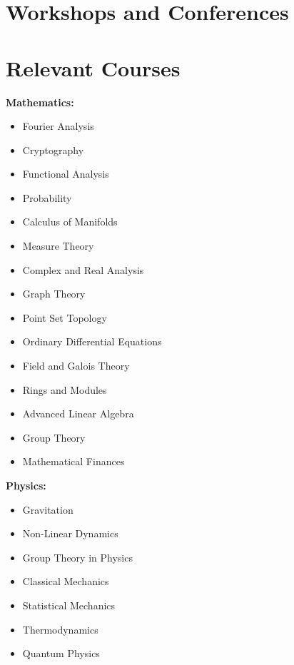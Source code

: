 \documentclass[11pt,a4paper,sans]{moderncv}
\begin{document}
\section{Workshops and Conferences}
\vspace{4mm}

\section{Relevant Courses}
\begin{minipage}[t]{0.45\textwidth}
    \textbf{Mathematics:}
    \begin{itemize}
        \item Fourier Analysis
        \item Cryptography 
        \item Functional Analysis
        \item Probability
        \item Calculus of Manifolds
        \item Measure Theory
        \item Complex and Real Analysis
        \item Graph Theory
        \item Point Set Topology
        \item Ordinary Differential Equations
        \item Field and Galois Theory
        \item Rings and Modules
        \item Advanced Linear Algebra
        \item Group Theory
        \item Mathematical Finances

    \end{itemize}
\end{minipage}\hfill
\begin{minipage}[t]{0.45\textwidth}
    \textbf{Physics:}
    \begin{itemize}
        \item Gravitation
        \item Non-Linear Dynamics
        \item Group Theory in Physics
        \item Classical Mechanics
        \item Statistical Mechanics
        \item Thermodynamics
        \item Quantum Physics
    \end{itemize}
\end{minipage}
\vspace{4mm}
\end{document}
